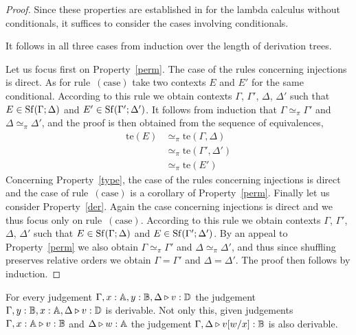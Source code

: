 \begin{proof}
Since these properties are established in \cite[Theorem 2.3]{dahlqvist2023complete} for the lambda calculus without conditionals,  it suffices to consider the cases involving conditionals.

  It follows in all three cases from induction over the length of derivation
trees. 

Let us focus first on Property~\eqref{perm}. The case of the rules concerning
injections is direct. As for rule~$(\text{case})$ take two contexts $E$ and
$E'$ for the same conditional. According to this rule we obtain contexts
$\Gamma$, $\Gamma'$, $\Delta$, $\Delta'$ such that $E \in
\mathrm{Sf}(\Gamma;\Delta)$ and $E' \in \mathrm{Sf}(\Gamma';\Delta')$. It follows from
induction that  $\Gamma \simeq_\pi \Gamma'$ and $\Delta \simeq_\pi \Delta'$,
and the proof is then obtained from the sequence of equivalences,
\begin{align*}
        \text{te}(E) & \simeq_\pi \text{te}(\Gamma, \Delta) 
        \\
        & \simeq_\pi \text{te}(\Gamma', \Delta')
        \\
        & \simeq_\pi \text{te}(E')
\end{align*}
Concerning Property~\eqref{type}, the case of the rules concerning injections
is direct and the case of rule~$(\text{case})$ is a corollary of
Property~\eqref{perm}. Finally let us consider Property~\eqref{der}. Again the
case concerning injections is direct and we thus focus only on
rule~$(\text{case})$. According to this rule we obtain contexts $\Gamma$,
$\Gamma'$, $\Delta$, $\Delta'$ such that $E \in \mathrm{Sf}(\Gamma;\Delta)$ and $E
\in \mathrm{Sf}(\Gamma';\Delta')$. By an appeal to Property~\eqref{perm} we also
obtain $\Gamma \simeq_\pi \Gamma'$ and $\Delta \simeq_\pi \Delta'$, and thus
since shuffling preserves relative orders we obtain $\Gamma = \Gamma'$ and
$\Delta = \Delta'$. The proof then follows by induction.
\end{proof}


\begin{lemma}
\label{lem:exh_and_sub} 
For every judgement $\Gamma,x: \mathbb{A}, y: \mathbb{B}, \Delta \triangleright v: \mathbb{D}$ the
judgement $\Gamma, y:\mathbb{B}, x:\mathbb{A}, \Delta \triangleright v:
\mathbb{D}$ is derivable. Not only this, given judgements  $\Gamma,x:\mathbb{A} \triangleright
v: \mathbb{B}$ and $\Delta \triangleright w: \mathbb{A}$ the judgement $\Gamma, \Delta \triangleright
v[w/x]: \mathbb{B}$ is also derivable.
\end{lemma}

